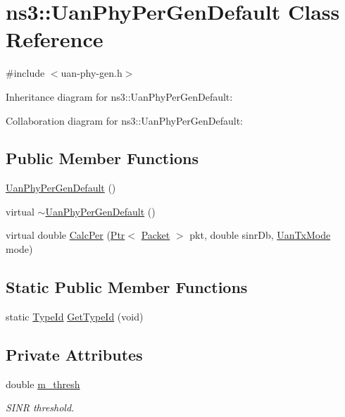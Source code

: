 \hypertarget{classns3_1_1UanPhyPerGenDefault}{}\section{ns3\+:\+:Uan\+Phy\+Per\+Gen\+Default Class Reference}
\label{classns3_1_1UanPhyPerGenDefault}


{\ttfamily \#include $<$uan-\/phy-\/gen.\+h$>$}



Inheritance diagram for ns3\+:\+:Uan\+Phy\+Per\+Gen\+Default\+:


Collaboration diagram for ns3\+:\+:Uan\+Phy\+Per\+Gen\+Default\+:
\subsection*{Public Member Functions}
\begin{DoxyCompactItemize}
\item 
\hyperlink{classns3_1_1UanPhyPerGenDefault_a2a9532517223c07e2ad55c87bc1d3e03}{Uan\+Phy\+Per\+Gen\+Default} ()
\item 
virtual \hyperlink{classns3_1_1UanPhyPerGenDefault_ad24f878c6b81cc90f3a414fa8898dc24}{$\sim$\+Uan\+Phy\+Per\+Gen\+Default} ()
\item 
virtual double \hyperlink{classns3_1_1UanPhyPerGenDefault_acac99eeffb6d97efc14fcb1e00570f30}{Calc\+Per} (\hyperlink{classns3_1_1Ptr}{Ptr}$<$ \hyperlink{classns3_1_1Packet}{Packet} $>$ pkt, double sinr\+Db, \hyperlink{classns3_1_1UanTxMode}{Uan\+Tx\+Mode} mode)
\end{DoxyCompactItemize}
\subsection*{Static Public Member Functions}
\begin{DoxyCompactItemize}
\item 
static \hyperlink{classns3_1_1TypeId}{Type\+Id} \hyperlink{classns3_1_1UanPhyPerGenDefault_aa55d7da7daefbf366ecb1178c0840995}{Get\+Type\+Id} (void)
\end{DoxyCompactItemize}
\subsection*{Private Attributes}
\begin{DoxyCompactItemize}
\item 
double \hyperlink{classns3_1_1UanPhyPerGenDefault_af1f09057ed0980e571ea03f106279e5b}{m\+\_\+thresh}
\begin{DoxyCompactList}\small\item\em S\+I\+NR threshold. \end{DoxyCompactList}\end{DoxyCompactItemize}
